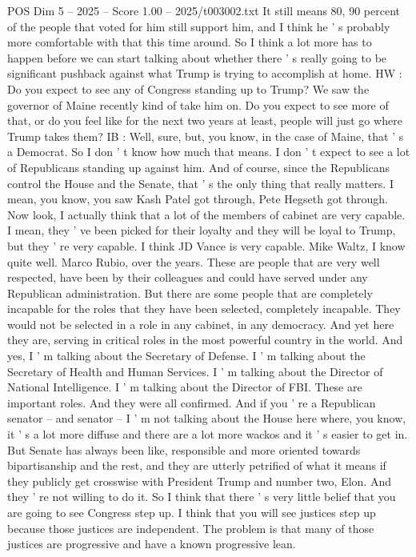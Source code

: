 \begin{textsample}{POS Dim 5 – 2025 – Score 1.00 – 2025/t003002.txt}
It still means 80, 90 percent of the people that voted for him still support him, and I think he ' s probably more comfortable with that this time around.
So I think a lot more has to happen before we can start talking about whether there ' s really going to be significant pushback against what Trump is trying to accomplish at home.
HW : Do you expect to see any of Congress standing up to Trump?
We saw the governor of Maine recently kind of take him on.
Do you expect to see more of that, or do you feel like for the next two years at least, people will just go where Trump takes them?
IB : Well, sure, but, you know, in the case of Maine, that ' s a Democrat.
So I don ' t know how much that means.
I don ' t expect to see a lot of Republicans standing up against him.
And of course, since the Republicans control the House and the Senate, that ' s the only thing that really matters.
I mean, you know, you saw Kash Patel got through, Pete Hegseth got through.
Now look, I actually think that a lot of the members of cabinet are very capable.
I mean, they ' ve been picked for their loyalty and they will be loyal to Trump, but they ' re very capable.
I think JD Vance is very capable.
Mike Waltz, I know quite well.
Marco Rubio, over the years.
These are people that are very well respected, have been by their colleagues and could have served under any Republican administration.
But there are some people that are completely incapable for the roles that they have been selected, completely incapable.
They would not be selected in a role in any cabinet, in any democracy.
And yet here they are, serving in critical roles in the most powerful country in the world.
And yes, I ' m talking about the Secretary of Defense.
I ' m talking about the Secretary of Health and Human Services.
I ' m talking about the Director of National Intelligence.
I ' m talking about the Director of FBI.
These are important roles.
And they were all confirmed.
And if you ' re a Republican senator -- and senator -- I ' m not talking about the House here where, you know, it ' s a lot more diffuse and there are a lot more wackos and it ' s easier to get in.
But Senate has always been like, responsible and more oriented towards bipartisanship and the rest, and they are utterly petrified of what it means if they publicly get crosswise with President Trump and number two, Elon.
And they ' re not willing to do it.
So I think that there ' s very little belief that you are going to see Congress step up.
I think that you will see justices step up because those justices are independent.
The problem is that many of those justices are progressive and have a known progressive lean.

\end{textsample}
